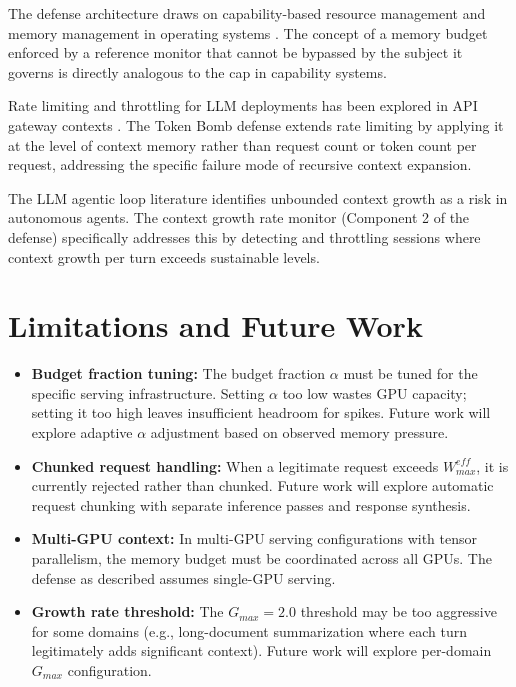 \documentclass[12pt]{article}
\begin{document}
The defense architecture draws on capability-based resource management \cite{dennis1966} and memory management in operating systems \cite{denning1968}. The concept of a memory budget enforced by a reference monitor that cannot be bypassed by the subject it governs is directly analogous to the cap in capability systems.

Rate limiting and throttling for LLM deployments has been explored in API gateway contexts \cite{openai-rate-limits}. The Token Bomb defense extends rate limiting by applying it at the level of context memory rather than request count or token count per request, addressing the specific failure mode of recursive context expansion.

The LLM agentic loop literature \cite{alenezi2026} identifies unbounded context growth as a risk in autonomous agents. The context growth rate monitor (Component 2 of the defense) specifically addresses this by detecting and throttling sessions where context growth per turn exceeds sustainable levels.

\section{Limitations and Future Work}
\label{sec:limitations}

\begin{itemize}
    \item \textbf{Budget fraction tuning:} The budget fraction $\alpha$ must be tuned for the specific serving infrastructure. Setting $\alpha$ too low wastes GPU capacity; setting it too high leaves insufficient headroom for spikes. Future work will explore adaptive $\alpha$ adjustment based on observed memory pressure.
    \item \textbf{Chunked request handling:} When a legitimate request exceeds $W_{max}^{eff}$, it is currently rejected rather than chunked. Future work will explore automatic request chunking with separate inference passes and response synthesis.
    \item \textbf{Multi-GPU context:} In multi-GPU serving configurations with tensor parallelism, the memory budget must be coordinated across all GPUs. The defense as described assumes single-GPU serving.
    \item \textbf{Growth rate threshold:} The $G_{max} = 2.0$ threshold may be too aggressive for some domains (e.g., long-document summarization where each turn legitimately adds significant context). Future work will explore per-domain $G_{max}$ configuration.
\end{itemize}
\end{document}
